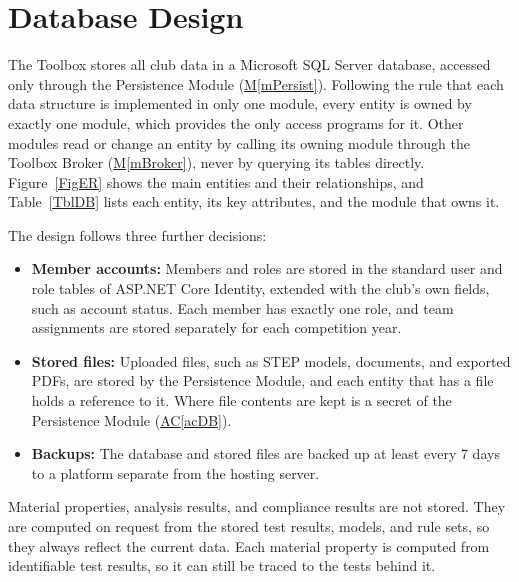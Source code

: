 \documentclass[12pt, titlepage]{article}
\newcommand{\acref}[1]{\hyperref[#1]{AC\ref*{#1}}}
\newcommand{\mref}[1]{\hyperref[#1:dec]{M\ref*{#1}}}
\begin{document}
\section{Database Design} \label{SecDB}

The Toolbox stores all club data in a Microsoft SQL Server database, accessed only through the Persistence Module (\mref{mPersist}). Following the rule that each data structure is implemented in only one module, every entity is owned by exactly one module, which provides the only access programs for it. Other modules read or change an entity by calling its owning module through the Toolbox Broker (\mref{mBroker}), never by querying its tables directly. Figure~\ref{FigER} shows the main entities and their relationships, and Table~\ref{TblDB} lists each entity, its key attributes, and the module that owns it.

The design follows three further decisions:
\begin{itemize}
\item \textbf{Member accounts:} Members and roles are stored in the standard user and role tables of ASP.NET Core Identity, extended with the club's own fields, such as account status. Each member has exactly one role, and team assignments are stored separately for each competition year.
\item \textbf{Stored files:} Uploaded files, such as STEP models, documents, and exported PDFs, are stored by the Persistence Module, and each entity that has a file holds a reference to it. Where file contents are kept is a secret of the Persistence Module (\acref{acDB}).
\item \textbf{Backups:} The database and stored files are backed up at least every 7 days to a platform separate from the hosting server.
\end{itemize}

Material properties, analysis results, and compliance results are not stored. They are computed on request from the stored test results, models, and rule sets, so they always reflect the current data. Each material property is computed from identifiable test results, so it can still be traced to the tests behind it.
\end{document}
